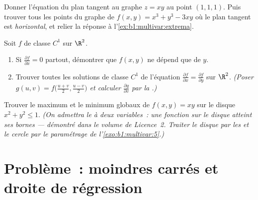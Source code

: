 \begin{exercise}[$\star\star$]\label{exo:b1:multivar:10}
Donner l'équation du plan tangent au graphe $z = xy$ au point
$(1, 1, 1)$. Puis trouver tous les points du graphe de
$f(x,y) = x^3 + y^3 - 3xy$ où le plan tangent est
\emph{horizontal}, et relier la réponse à
l'\cref{ex:b1:multivar:extrema}.
\end{exercise}

\begin{exercise}[$\star\star$]\label{exo:b1:multivar:11}
Soit $f$ de classe $C^1$ sur $\R^2$.
\begin{enumerate}
  \item Si $\frac{\partial f}{\partial x} = 0$ partout, démontrer
        que $f(x, y)$ ne dépend que de $y$.
  \item Trouver toutes les solutions de classe $C^1$ de l'équation
        $\frac{\partial f}{\partial x} = \frac{\partial
        f}{\partial y}$ sur $\R^2$. \emph{(Poser $g(u, v) =
        f\bigl(\frac{u+v}2, \frac{u-v}2\bigr)$ et calculer
        $\frac{\partial g}{\partial v}$ par la .)}
\end{enumerate}
\end{exercise}

\begin{exercise}[$\star\star\star$]\label{exo:b1:multivar:12}
Trouver le maximum et le minimum globaux de $f(x, y) = xy$ sur le
disque  $x^2 + y^2 \leq 1$. \emph{(On admettra le  à deux variables~: une fonction  sur
le disque  atteint ses bornes --- démontré dans le volume de
Licence~2. Traiter le disque  par les  et le
cercle  par le paramétrage de l'\cref{exo:b1:multivar:5}.)}
\end{exercise}

\section{Problème~: moindres carrés et droite de régression}

